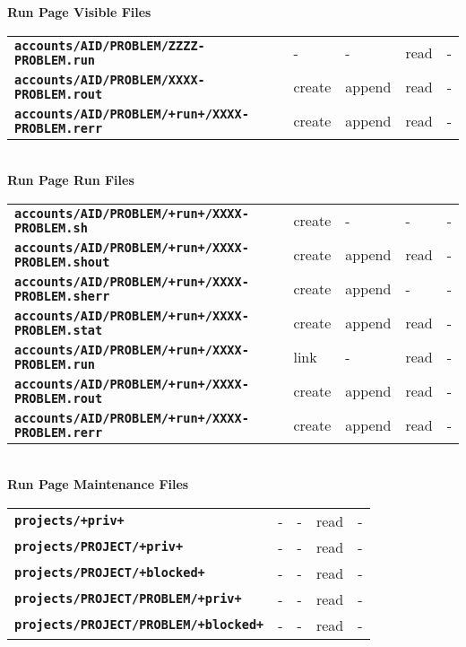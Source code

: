 \documentclass[12pt]{article}
\newcommand{\TT}[1]{{\tt \bfseries #1}}
\begin{document}
\begin{center}
{\bf Run Page Visible Files}
\\[1ex]
\begin{tabular}{lllll}
\TT{accounts/AID/PROBLEM/ZZZZ-PROBLEM.run}  & -  & - & read & - \\
\TT{accounts/AID/PROBLEM/XXXX-PROBLEM.rout} & create  & append  & read & - \\
\TT{accounts/AID/PROBLEM/+run+/XXXX-PROBLEM.rerr}
					    & create  & append  & read & - \\
\end{tabular}
\\\bigskip
{\bf Run Page Run Files}
\\[1ex]
\begin{tabular}{lllll}
\TT{accounts/AID/PROBLEM/+run+/XXXX-PROBLEM.sh}     & create  & - & - & - \\
\TT{accounts/AID/PROBLEM/+run+/XXXX-PROBLEM.shout}  & create  & append & read
                                                                       & - \\
\TT{accounts/AID/PROBLEM/+run+/XXXX-PROBLEM.sherr}  & create  & append & -
                                                                       & - \\
\TT{accounts/AID/PROBLEM/+run+/XXXX-PROBLEM.stat}   & create  & append & read
                                                                       & - \\
\TT{accounts/AID/PROBLEM/+run+/XXXX-PROBLEM.run}    & link    & - & read & - \\
\TT{accounts/AID/PROBLEM/+run+/XXXX-PROBLEM.rout}   & create  & append & read
                                                                       & - \\
\TT{accounts/AID/PROBLEM/+run+/XXXX-PROBLEM.rerr}   & create  & append & read
                                                                       & - \\
\end{tabular}
\\\bigskip
{\bf Run Page Maintenance Files}
\\[1ex]
\begin{tabular}{lllll}
\TT{projects/+priv+}			& -  & - & read & - \\
\TT{projects/PROJECT/+priv+}		& -  & - & read & - \\
\TT{projects/PROJECT/+blocked+}		& -  & - & read & - \\
\TT{projects/PROJECT/PROBLEM/+priv+}	& -  & - & read & - \\
\TT{projects/PROJECT/PROBLEM/+blocked+}	& -  & - & read & - \\
\end{tabular}
\end{center}
\end{document}

